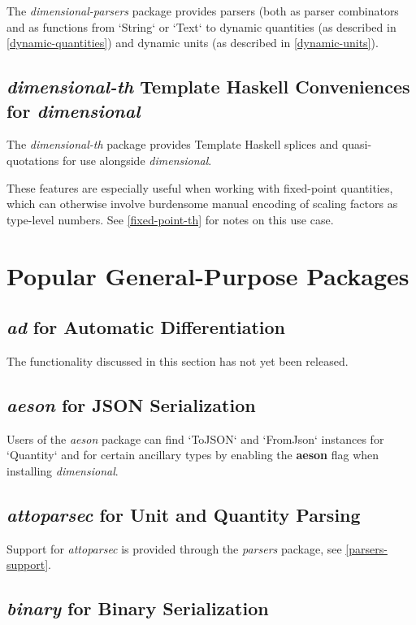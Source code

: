 \documentclass[11pt]{report}
\newcommand{\packagename}[1]{\textit{#1}}
\newcommand{\thispackage}{\packagename{dimensional}}
\newcommand{\flag}[1]{\textbf{#1}}
\newcommand{\prerelease}{\begin{framed}
The functionality discussed in this section has not yet been released.
\end{framed}}
\begin{document}
The \packagename{dimensional-parsers} package provides parsers (both as parser combinators and as functions from `String` or `Text` to
dynamic quantities (as described in \ref{dynamic-quantities}) and dynamic units (as described in \ref{dynamic-units}).


\subsection{\packagename{dimensional-th} Template Haskell Conveniences for \thispackage{}}

The \packagename{dimensional-th} package provides Template Haskell splices and quasi-quotations for use alongside \thispackage{}.

These features are especially useful when working with fixed-point quantities, which can otherwise involve burdensome manual encoding
of scaling factors as type-level numbers. See \ref{fixed-point-th} for notes on this use case.


\section{Popular General-Purpose Packages}

\subsection{\packagename{ad} for Automatic Differentiation}

\prerelease{}

\subsection{\packagename{aeson} for JSON Serialization}

Users of the \packagename{aeson} package can find `ToJSON`
and `FromJson` instances for `Quantity` and for certain ancillary types by
enabling the \flag{aeson} flag when installing \thispackage{}.

\subsection{\packagename{attoparsec} for Unit and Quantity Parsing}

Support for \packagename{attoparsec} is provided through the \packagename{parsers} package, see \ref{parsers-support}.

\subsection{\packagename{binary} for Binary Serialization}
\end{document}
